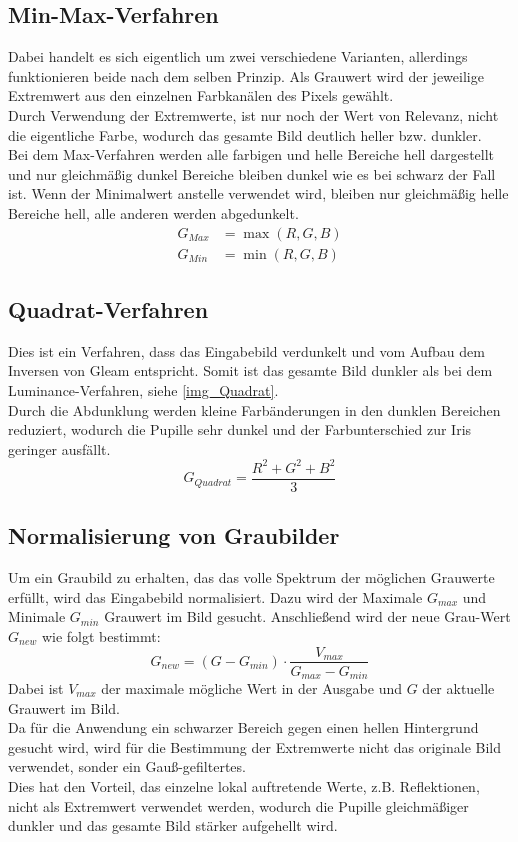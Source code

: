 \subsection{Min-Max-Verfahren}
\label{gray_MinMax}
Dabei handelt es sich eigentlich um zwei verschiedene Varianten, allerdings funktionieren beide nach dem selben Prinzip. Als Grauwert wird der jeweilige Extremwert aus den einzelnen Farbkanälen des Pixels gewählt.\\
Durch Verwendung der Extremwerte, ist nur noch der Wert von Relevanz, nicht die eigentliche Farbe, wodurch das gesamte Bild deutlich heller bzw. dunkler.\\
Bei dem Max-Verfahren werden alle farbigen und helle Bereiche hell dargestellt und nur gleichmäßig dunkel Bereiche bleiben dunkel wie es bei schwarz der Fall ist. Wenn der Minimalwert anstelle verwendet wird, bleiben nur gleichmäßig helle Bereiche hell, alle anderen werden abgedunkelt.
\begin{align*}
G_{Max} &= \max(R,G,B)\\
G_{Min} &= \min(R,G,B)
\end{align*}
\subsection{Quadrat-Verfahren}
\label{gray_Quadrat}
Dies ist ein Verfahren, dass das Eingabebild verdunkelt und vom Aufbau dem Inversen von Gleam entspricht. Somit ist das gesamte Bild dunkler als bei dem Luminance-Verfahren, siehe \autoref{img_Quadrat}.\\
Durch die Abdunklung werden kleine Farbänderungen in den dunklen Bereichen reduziert, wodurch die Pupille sehr dunkel und der Farbunterschied zur Iris geringer ausfällt.
\[G_{Quadrat}=\dfrac{R^2+G^2+B^2}{3}\]
\subsection{Normalisierung von Graubilder}
Um ein Graubild zu erhalten, das das volle Spektrum der möglichen Grauwerte erfüllt, wird das Eingabebild normalisiert. Dazu wird der Maximale $G_{max}$ und Minimale $G_{min}$ Grauwert im Bild gesucht. Anschließend wird der neue Grau-Wert $G_{new}$ wie folgt bestimmt:
\[G_{new} = (G-G_{min})\cdot \dfrac{V_{max}}{G_{max}-G_{min}}\]
Dabei ist $V_{max}$ der maximale mögliche Wert in der Ausgabe und $G$ der aktuelle Grauwert im Bild.\\
Da für die Anwendung ein schwarzer Bereich gegen einen hellen Hintergrund gesucht wird, wird für die Bestimmung der Extremwerte nicht das originale Bild verwendet, sonder ein Gauß-gefiltertes.\\
Dies hat den Vorteil, das einzelne lokal auftretende Werte, z.B. Reflektionen, nicht als Extremwert verwendet werden, wodurch die Pupille gleichmäßiger dunkler und das gesamte Bild stärker aufgehellt wird.
